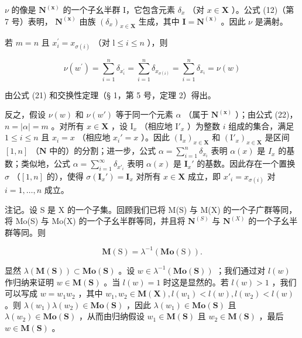\(\nu\) 的像是 \(\mathbf{N}^{(\mathbf{x})}\) 的一个子幺半群 I，它包含元素 \(\delta_x\) （对 \(x \in \mathbf{X}\) ）。公式 (12)（第 7 号）表明， \(\mathbf{N}^{(\mathbf{x})}\) 由族 \((\delta_x)_{x \in \mathbf{X}}\) 生成，其中 \(\mathbf{I} = \mathbf{N}^{(\mathbf{x})}\) 。因此 \(\nu\) 是满射。

若 \(m = n\) 且 \(x_{i}^{\prime} = x_{\sigma (i)}\) （对 \(\mathrm{l}\leqslant i\leqslant n\) ），则

\[
\nu (w ^ {\prime}) = \sum_ {i = 1} ^ {n} \delta_ {x _ {i} ^ {\prime}} = \sum_ {i = 1} ^ {n} \delta_ {x _ {\sigma (i)}} = \sum_ {i = 1} ^ {n} \delta_ {x _ {i}} = \nu (w)
\]

由公式 (21) 和交换性定理（§ 1，第 5 号，定理 2）得出。

反之，假设 \(\nu(w)\) 和 \(\nu(w')\) 等于同一个元素 \(\alpha\) （属于 \(\mathbf{N}^{(\mathbf{x})}\) ）；由公式 (22)， \(n = |\alpha| = m\) 。对所有 \(x \in \mathbf{X}\) ，设 \(\mathrm{I}_x\) （相应地 \(\mathrm{I}'_x\) ）为整数 \(i\) 组成的集合，满足 \(1 \leqslant i \leqslant n\) 且 \(x_i = x\) （相应地 \(x_i' = x\) ）。因此 \((\mathrm{I}_x)_{x \in \mathbf{X}}\) 和 \((\mathrm{I}'_x)_{x \in \mathbf{X}}\) 是区间 \([1, n]\) （\(\mathbf{N}\) 中的）的分割；进一步，公式 \(\alpha = \sum_{i=1}^{n} \delta_{x_i}\) 表明 \(\alpha(x)\) 是 \(I_x\) 的基数；类似地，公式 \(\alpha = \sum_{i=1}^{\infty} \delta_{x'_i}\) 表明 \(\alpha(x)\) 是 \(\mathbf{I}_x'\) 的基数。因此存在一个置换 \(\sigma\) （\([1, n]\) 的），使得 \(\sigma(\mathbf{I}_x') = \mathbf{I}_x\) 对所有 \(x \in \mathbf{X}\) 成立，即 \(x'_i = x_{\sigma(i)}\) 对 \(i = 1, \ldots, n\) 成立。

注记。设 S 是 X 的一个子集。回顾我们已将 M(S) 与 M(X) 的一个子广群等同，将 Mo(S) 与 Mo(X) 的一个子幺半群等同，并且将 \(\mathbf{N}^{(S)}\) 与 \(\mathbf{N}^{(X)}\) 的一个子幺半群等同。则

\[
\mathbf {M} (\mathrm{S}) = \lambda^ {- 1} (\mathbf {M o} (\mathrm{S})).\tag{23}
\]

显然 \(\lambda (\mathbf{M}(\mathbf{S}))\subset \mathbf{Mo}(\mathbf{S})\) 。设 \(w\in \lambda^{-1}(\mathbf{Mo}(\mathbf{S}))\) ；我们通过对 \(l(w)\) 作归纳来证明 \(w\in \mathbf{M}(\mathbf{S})\) 。当 \(l(w) = 1\) 时这是显然的。若 \(l(w) > 1\) ，我们可以写成 \(w = w_{1}w_{2}\) ，其中 \(w_{1},w_{2}\in \mathbf{M}(\mathbf{X}), l(w_{1}) <   l(w),l(w_{2}) <   l(w)\) 。则 \(\lambda (w_1)\lambda (w_2)\in \mathbf{Mo}(\mathbf{S})\) ，因此 \(\lambda (w_1)\in \mathbf{Mo}(\mathbf{S})\) 且 \(\lambda (w_2)\in \mathbf{Mo}(\mathbf{S})\) ，从而由归纳假设 \(w_{1}\in \mathbf{M}(\mathbf{S})\) 且 \(w_{2}\in \mathbf{M}(\mathbf{S})\) ，最后 \(w\in \mathbf{M}(\mathbf{S})\) 。

